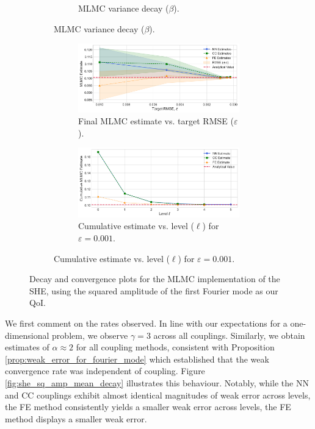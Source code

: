 \begin{figure}[htbp]
\begin{subfigure}{\textwidth}
\begin{subfigure}[b]{0.48\textwidth}
            \caption{MLMC variance decay ($\beta$).}
            \label{fig:she_sq_amp_variance_decay}
        \end{subfigure}        
    \end{subfigure}
    \vspace{1cm}
    \begin{subfigure}{\textwidth}
        \centering
        \begin{subfigure}[b]{\textwidth}
            \centering
            \includegraphics[width=0.7\linewidth]{graphics/she_sq_amp_conv.png}
            \caption{Final MLMC estimate vs. target RMSE ($\varepsilon$).}
            \label{fig:she_sq_amp_conv_vs_eps}
        \end{subfigure}
        \vspace{0.5cm}
        \begin{subfigure}[b]{\textwidth}
            \centering
            \includegraphics[width=0.7\linewidth]{graphics/she_sq_amp_cumconv.png}
            \caption{Cumulative estimate vs. level ($\ell$) for $\varepsilon=0.001$.}
            \label{fig:she_sq_amp_cumulative_conv}
        \end{subfigure}
    \end{subfigure}
    \caption{Decay and convergence plots for the MLMC implementation of the SHE, using the squared 
    amplitude of the first Fourier mode as our QoI.}
    \label{fig:she_validation_combined}
\end{figure}


We first comment on the rates observed. In line with our expectations for a one-dimensional 
problem, 
we observe $\gamma = 3$ across 
all couplings. Similarly, we obtain estimates of $\alpha \approx 2$ for all coupling methods,
consistent with Proposition \ref{prop:weak_error_for_fourier_mode} which 
established that the weak convergence rate was independent of coupling.
Figure \ref{fig:she_sq_amp_mean_decay} illustrates this behaviour. Notably,
while the NN and CC couplings exhibit almost identical magnitudes of weak error across 
levels, the FE method consistently yields a smaller 
weak error across levels, the FE method displays a smaller weak error.

